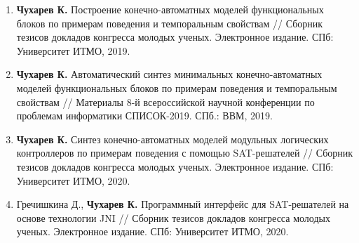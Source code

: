 \begin{enumerate}[left=0pt, beginpenalty=10000]
    \item \textbf{Чухарев К.} Построение конечно-автоматных моделей функциональных блоков по примерам поведения и темпоральным свойствам // Сборник тезисов докладов конгресса молодых ученых. Электронное издание. СПб: Университет ИТМО, 2019.
    \item \textbf{Чухарев К.} Автоматический синтез минимальных конечно-автоматных моделей функциональных блоков по примерам поведения и темпоральным свойствам // Материалы 8-й всероссийской научной конференции по проблемам информатики СПИСОК-2019. СПб.: ВВМ, 2019.
    \item \textbf{Чухарев К.} Синтез конечно-автоматных моделей модульных логических контроллеров по примерам поведения с помощью SAT-решателей // Сборник тезисов докладов конгресса молодых ученых. Электронное издание. СПб: Университет ИТМО, 2020.
    \item Гречишкина Д., \textbf{Чухарев К.} Программный интерфейс для SAT-решателей на основе технологии JNI // Сборник тезисов докладов конгресса молодых ученых. Электронное издание. СПб: Университет ИТМО, 2020.
\end{enumerate}

